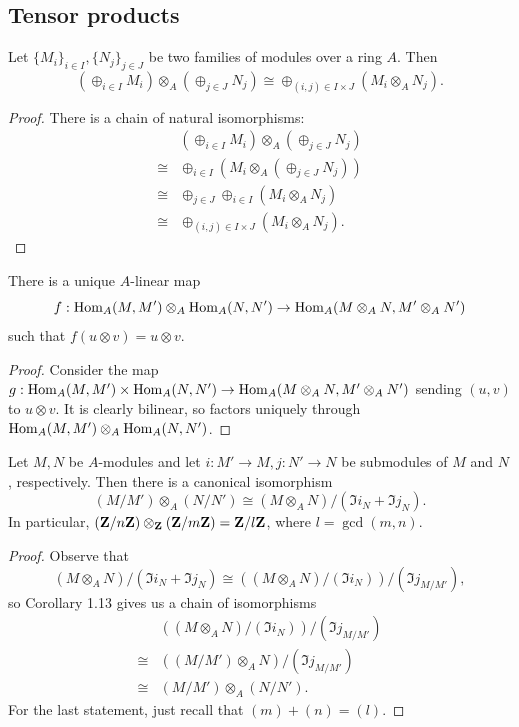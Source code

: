 \subsection{Tensor products}
\begin{exer}
	Let $\{ M_i \}_{i \in I},\{ N_j \}_{j \in J}$ be two families of modules
	over a ring $A$. Then
	\[
		(\oplus_{i \in I} M_i) \otimes_A (\oplus_{j \in J} N_j)
		\cong \oplus_{(i,j) \in I \times J} (M_i \otimes_A N_j).
	\]
\end{exer}
\begin{proof}
	There is a chain of natural isomorphisms:
	\begin{align*}
		&(\oplus_{i \in I} M_i) \otimes_A (\oplus_{j \in J} N_j)\\
		\cong&\oplus_{i \in I} (M_i \otimes_A (\oplus_{j \in J} N_j))\\
		\cong&\oplus_{j \in J}\oplus_{i \in I} (M_i \otimes_A N_j)\\
		\cong&\oplus_{(i,j) \in I \times J} (M_i \otimes_A N_j).
	\end{align*}
\end{proof}

\begin{exer}
	There is a unique $A$-linear map
	\[
		f: \operatorname{Hom}_A(M,M') \otimes_A \operatorname{Hom}_A(N,N') \to
		\operatorname{Hom}_A(M \otimes_A N,M' \otimes_A N')
	\]
	such that $f(u \otimes v) = u \otimes v$.
\end{exer}

\begin{proof}
	Consider the map $g:\operatorname{Hom}_A(M,M') \times \operatorname{Hom}_A(N,N') \to
		\operatorname{Hom}_A(M \otimes_A N,M' \otimes_A N')$ sending $(u,v)$ to
	$u \otimes v$. It is clearly bilinear, so factors uniquely through
	$\operatorname{Hom}_A(M,M') \otimes_A \operatorname{Hom}_A(N,N')$.
\end{proof}

\begin{exer}
	Let $M,N$ be $A$-modules and let $i:M' \to M, j:N' \to N$ be submodules
	of $M$ and $N$, respectively. Then there is a canonical isomorphism
	\[
		(M/M') \otimes_A (N/N')
		\cong (M \otimes_A N)/(\Im i_N + \Im j_N).
	\]
	In particular, $(\mathbf{Z}/n\mathbf{Z})\otimes_{\mathbf{Z}} (\mathbf{Z}/m\mathbf{Z}) = \mathbf{Z}/l \mathbf{Z}$, where
	$l=\gcd(m,n)$.
\end{exer}

\begin{proof}
	Observe that
	\[
		(M \otimes_A N)/(\Im i_N + \Im j_N)
		\cong ((M \otimes_A N)/(\Im i_N))/(\Im j_{M/M'}),
	\]
	so Corollary 1.13 gives us a chain of isomorphisms
	\begin{align*}
		&((M \otimes_A N)/(\Im i_N))/(\Im j_{M/M'})\\
		\cong&((M/M') \otimes_A N)/(\Im j_{M/M'})\\
		\cong&(M/M') \otimes_A (N/N').
	\end{align*}
	For the last statement, just recall that $(m)+(n)=(l)$.
\end{proof}

